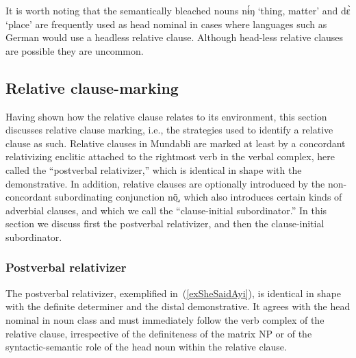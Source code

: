 \documentclass[10pt,twoside]{article}
\def\ci#1{{\ipaFont #1}}
\newcommand{\gl}[1]{`#1'}
\newcommand{\pref}[1]{(\ref{#1})}
\begin{document}
It is worth noting that the semantically bleached nouns \ci{nɨ́ŋ} \gl{thing, matter} 
and \ci{dɛ̀} \gl{place} 
are frequently used as head nominal in cases where languages such as German 
would use a headless relative clause.
Although head-less relative clauses are possible they are uncommon.

\subsection{Relative clause-marking}\label{secMundabliRelativizer}

Having shown how the relative clause relates to its environment, this section discusses 
relative clause marking, i.e., the strategies used to identify a relative clause as such. 
Relative clauses in Mundabli are marked at least by a concordant relativizing enclitic attached
to the rightmost verb in the verbal complex, here called the ``postverbal relativizer,'' 
which is identical in shape with the demonstrative.
In addition, relative clauses are optionally introduced by the non-concordant subordinating conjunction \ci{nō̤}, 
which also introduces certain kinds of adverbial clauses, and which we call the ``clause-initial subordinator.'' 
In this section we discuss first the postverbal relativizer,
and then the clause-initial subordinator.

\subsubsection{Postverbal relativizer}
The postverbal relativizer, exemplified in~\pref{exSheSaidAyi}, is identical in shape with the definite determiner and the distal 
demonstrative. It agrees with the head nominal in noun class and must immediately follow the 
verb complex of the relative clause, irrespective of the definiteness of the matrix NP or of the syntactic-semantic 
role of the head noun within the relative clause.
\end{document}
